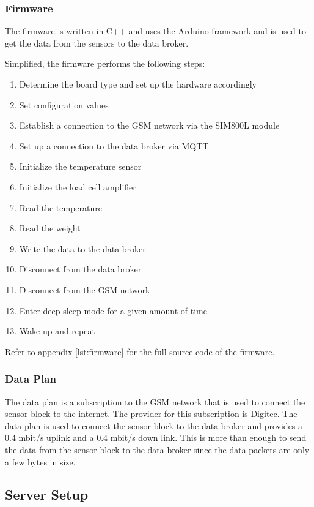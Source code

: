\newpage
\subsubsection {Firmware} \label{sec:firmware}
The firmware is written in C++ and uses the Arduino framework and is used to get the data from the sensors to the data broker.

Simplified, the firmware performs the following steps:

\begin{enumerate}
    \item Determine the board type and set up the hardware accordingly
    \item Set configuration values
    \item Establish a connection to the GSM network via the SIM800L module
    \item Set up a connection to the data broker via MQTT
    \item Initialize the temperature sensor
    \item Initialize the load cell amplifier
    \item Read the temperature
    \item Read the weight
    \item Write the data to the data broker
    \item Disconnect from the data broker
    \item Disconnect from the GSM network
    \item Enter deep sleep mode for a given amount of time
    \item Wake up and repeat
\end{enumerate}

Refer to appendix \ref{lst:firmware} for the full source code of the firmware.

\subsubsection {Data Plan} \label{sec:data_plan}
The data plan is a subscription to the GSM network that is used to connect the sensor block to the internet. The provider for this subscription is Digitec. The data plan is used to connect the sensor block to the data broker and provides a 0.4 mbit/s uplink and a 0.4 mbit/s down link. This is more than enough to send the data from the sensor block to the data broker since the data packets are only a few bytes in size.

\subsection{Server Setup}
